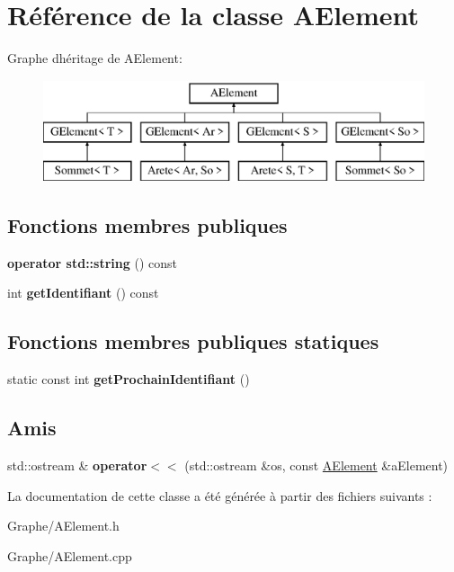 \hypertarget{class_a_element}{}\section{Référence de la classe A\+Element}
\label{class_a_element}
Graphe d\textquotesingle{}héritage de A\+Element\+:\begin{figure}[H]
\begin{center}
\leavevmode
\includegraphics[height=3.000000cm]{class_a_element}
\end{center}
\end{figure}
\subsection*{Fonctions membres publiques}
\begin{DoxyCompactItemize}
\item 
\mbox{\label{class_a_element_ab127c3e12cb3ce5f418d94e4076b7977}} 
{\bfseries operator std\+::string} () const
\item 
\mbox{\label{class_a_element_ac060be1218c6d16cd2e04a03c59db363}} 
int {\bfseries get\+Identifiant} () const
\end{DoxyCompactItemize}
\subsection*{Fonctions membres publiques statiques}
\begin{DoxyCompactItemize}
\item 
\mbox{\label{class_a_element_a381a44c61665f8b226b8c4d9d33bba25}} 
static const int {\bfseries get\+Prochain\+Identifiant} ()
\end{DoxyCompactItemize}
\subsection*{Amis}
\begin{DoxyCompactItemize}
\item 
\mbox{\label{class_a_element_aeda3502022d5d2a1aee7ab15a6f74f9c}} 
std\+::ostream \& {\bfseries operator$<$$<$} (std\+::ostream \&os, const \mbox{\hyperlink{class_a_element}{A\+Element}} \&a\+Element)
\end{DoxyCompactItemize}


La documentation de cette classe a été générée à partir des fichiers suivants \+:\begin{DoxyCompactItemize}
\item 
Graphe/A\+Element.\+h\item 
Graphe/A\+Element.\+cpp\end{DoxyCompactItemize}
